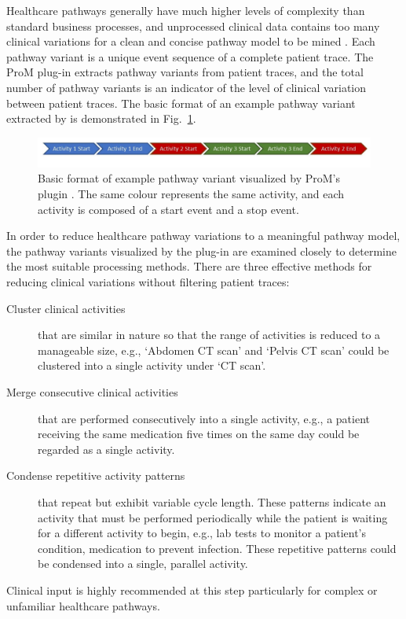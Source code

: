 Healthcare pathways generally have much higher levels of complexity than standard business processes, and unprocessed clinical data contains too many clinical variations for a clean and concise pathway model to be mined \cite{Huang2013, Veiga2010}. Each pathway variant is a unique event sequence of a complete patient trace. The ProM plug-in  extracts pathway variants from patient traces, and the total number of pathway variants is an indicator of the level of clinical variation between patient traces. The basic format of an example pathway variant extracted by  is demonstrated in  Fig.~\ref{fig:example pathway variant}.

\begin{figure}[t]
\centering
\includegraphics[width=\textwidth]{images/example_pathway_variant_format2.jpg}
\caption{Basic format of example pathway variant visualized by ProM's
  plugin . The same colour represents the same activity, and each activity is composed of a start event and a stop event.}
\label{fig:example pathway variant}
\end{figure}

In order to reduce healthcare pathway variations to a meaningful pathway model, the pathway variants visualized by the plug-in  are examined closely to determine the most suitable processing methods. 
There are three effective methods for reducing clinical variations without filtering patient traces:

\begin{description}
    \item[Cluster clinical activities] that are similar in nature so that the range of activities is reduced to a manageable size, e.g., `Abdomen CT scan' and `Pelvis CT scan' could be clustered into a single activity under `CT scan'.
    \item[Merge consecutive clinical activities] that are performed consecutively into a single activity, e.g., a patient receiving the same medication five times on the same day could be regarded as a single activity.
    \item[Condense repetitive activity patterns] 
         that repeat but exhibit variable cycle length. These patterns indicate an activity that must be performed periodically while the patient is waiting for a different activity to begin, e.g., lab tests to monitor a patient’s condition, medication to prevent infection. These repetitive patterns could be condensed into a single, parallel activity.
\end{description}
Clinical input is highly recommended at this step particularly for complex or unfamiliar healthcare pathways. 

